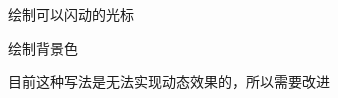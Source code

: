 
\begin{DoxyRefList}
\item[\label{todo__todo000002}%
\Hypertarget{todo__todo000002}%
Member \hyperlink{class_c_child_view_a434383ba85ab567141366ecddeb2c9d6}{C\+Child\+View\+:\+:m\+\_\+paint\+Cur} (C\+DC \&dc)]绘制可以闪动的光标  
\item[\label{todo__todo000001}%
\Hypertarget{todo__todo000001}%
Member \hyperlink{class_c_child_view_a4764e41ed2ac3f2ce69916b3881894fe}{C\+Child\+View\+:\+:m\+\_\+paint\+Text} (C\+DC \&dc)]绘制背景色  
\item[\label{todo__todo000003}%
\Hypertarget{todo__todo000003}%
Member \hyperlink{class_c_child_view_ad3cb2f8d9fa9a6fb06989513dee5a8bc}{C\+Child\+View\+:\+:On\+Mouse\+Move} (U\+I\+NT n\+Flags, C\+Point point)]目前这种写法是无法实现动态效果的，所以需要改进 
\end{DoxyRefList}